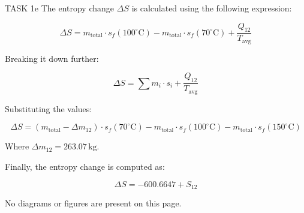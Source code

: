 TASK 1e  
The entropy change \( \Delta S \) is calculated using the following expression:  

\[
\Delta S = m_{\text{total}} \cdot s_f(100^\circ\text{C}) - m_{\text{total}} \cdot s_f(70^\circ\text{C}) + \frac{Q_{12}}{T_{\text{avg}}}
\]

Breaking it down further:  

\[
\Delta S = \sum m_i \cdot s_i + \frac{Q_{12}}{T_{\text{avg}}}
\]

Substituting the values:  

\[
\Delta S = (m_{\text{total}} - \Delta m_{12}) \cdot s_f(70^\circ\text{C}) - m_{\text{total}} \cdot s_f(100^\circ\text{C}) - m_{\text{total}} \cdot s_f(150^\circ\text{C})
\]

Where \( \Delta m_{12} = 263.07 \, \text{kg} \).  

Finally, the entropy change is computed as:  

\[
\Delta S = -600.6647 + S_{12}
\]  

No diagrams or figures are present on this page.